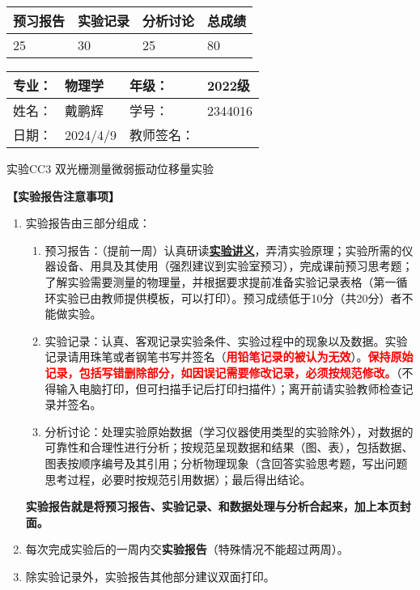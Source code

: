 \documentclass[dvipsnames, svgnames,a4paper,11pt]{article}
\begin{document}
\begin{table}
	\renewcommand\arraystretch{1.7}
	\begin{tabularx}{\textwidth}{
		|X|X|X|X
		|X|X|X|X|}
	\hline
	\multicolumn{2}{|c|}{预习报告}&\multicolumn{2}{|c|}{实验记录}&\multicolumn{2}{|c|}{分析讨论}&\multicolumn{2}{|c|}{总成绩}\\
	\hline
	\LARGE25 & & \LARGE30 & & \LARGE25 & & \LARGE80 & \\
	\hline
	\end{tabularx}
\end{table}


\begin{table}
	\renewcommand\arraystretch{1.7}
	\begin{tabularx}{\textwidth}{|X|X|X|X|}
	\hline
	专业：& 物理学 &年级：& 2022级\\
	\hline
	姓名：& 戴鹏辉  & 学号： & 2344016 \\
	\hline
	日期：& 2024/4/9 & 教师签名：& \\
	\hline
	\end{tabularx}
\end{table}

\begin{center}
	\LARGE 实验CC3 \quad 双光栅测量微弱振动位移量实验
\end{center}

\textbf{【实验报告注意事项】}
\begin{enumerate}
	\item 实验报告由三部分组成：
	\begin{enumerate}
		\item 预习报告：（提前一周）认真研读\underline{\textbf{实验讲义}}，弄清实验原理；实验所需的仪器设备、用具及其使用（强烈建议到实验室预习），完成课前预习思考题；了解实验需要测量的物理量，并根据要求提前准备实验记录表格（第一循环实验已由教师提供模板，可以打印）。预习成绩低于10分（共20分）者不能做实验。
	    \item 实验记录：认真、客观记录实验条件、实验过程中的现象以及数据。实验记录请用珠笔或者钢笔书写并签名（\textcolor{red}{\textbf{用铅笔记录的被认为无效}}）。\textcolor{red}{\textbf{保持原始记录，包括写错删除部分，如因误记需要修改记录，必须按规范修改。}}（不得输入电脑打印，但可扫描手记后打印扫描件）；离开前请实验教师检查记录并签名。
	    \item 分析讨论：处理实验原始数据（学习仪器使用类型的实验除外），对数据的可靠性和合理性进行分析；按规范呈现数据和结果（图、表），包括数据、图表按顺序编号及其引用；分析物理现象（含回答实验思考题，写出问题思考过程，必要时按规范引用数据）；最后得出结论。
	\end{enumerate}
	\textbf{实验报告就是将预习报告、实验记录、和数据处理与分析合起来，加上本页封面。}
	\item 每次完成实验后的一周内交\textbf{实验报告}（特殊情况不能超过两周）。
	\item 除实验记录外，实验报告其他部分建议双面打印。
\end{enumerate}
\end{document}
